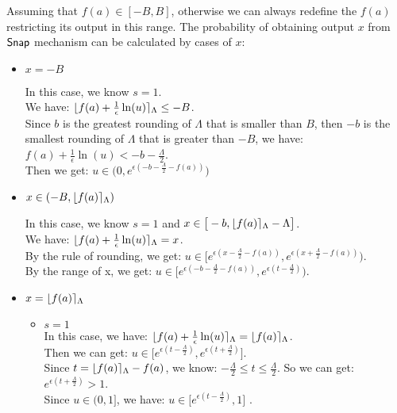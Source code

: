 \documentclass[a4paper,11pt]{article}
\begin{document}
Assuming that $f(a) \in [-B, B]$, otherwise we can always redefine the $f(a)$ restricting its output in this range.
The probability of obtaining output $x$ from $\mathsf{Snap}$ mechanism can be calculated by cases of $x$:
\begin{itemize}
	\item[\textbf{case}] $x = -B$

	In this case, we know $s = 1$.\\
	We have: $\lfloor f(a) + \frac{1}{\epsilon} \ln(u) \rceil_{\Lambda} \leq -B $.\\
	Since $b$ is the greatest rounding of $\Lambda$ that is smaller than $B$,
	then $-b$ is the smallest rounding of $\Lambda$ that is greater than $-B$, we have:
	$f(a) + \frac{1}{\epsilon} \ln(u) < -b - \frac{\Lambda}{2}$.\\
	Then we get:
	{\color{red}
	$u \in 
	\big(
	0, e^{\epsilon (-b - \frac{\Lambda}{2} - f(a))}
	\big)$
	}

	\item[\textbf{case}] $x \in (-B, \lfloor f(a) \rceil_{\Lambda})$
	
	In this case, we know $s = 1$ 
	and $x \in \big[-b, \lfloor f(a) \rceil_{\Lambda} - \Lambda\big]$.\\
	We have: $\lfloor f(a) + \frac{1}{\epsilon} \ln(u) \rceil_{\Lambda} = x $.\\
	By the rule of rounding, we get:
	{\color{red}
	$u \in 
	\bigg[
	e^{\epsilon (x - \frac{\Lambda}{2} - f(a))},
	e^{\epsilon (x + \frac{\Lambda}{2} - f(a))}
	\bigg)$}.\\
	By the range of x, we get:
	{\color{red}
	$u \in 
	\bigg[
	e^{\epsilon (-b - \frac{\Lambda}{2} - f(a))},
	e^{\epsilon (t - \frac{\Lambda}{2})}
	\bigg)$}.


	\item[\textbf{case}] $x = \lfloor f(a) \rceil_{\Lambda}$

	\begin{itemize}
		\item[\textbf{subcase}] $s = 1$\\
		In this case, we have: $\lfloor f(a) + \frac{1}{\epsilon} \ln(u) \rceil_{\Lambda} = \lfloor f(a) \rceil_{\Lambda}$.\\
		Then we can get:
		$u \in 
		\big[
		e^{\epsilon(t - \frac{\Lambda}{2})},
		e^{\epsilon(t + \frac{\Lambda}{2})}
		\big]$.\\
		Since $t = \lfloor f(a) \rceil_{\Lambda} - f(a)$, we know: $- \frac{\Lambda}{2} \leq t \leq \frac{\Lambda}{2}$. So we can get: $e^{\epsilon(t + \frac{\Lambda}{2})} > 1$.\\
		Since $u \in (0, 1]$, we have:
		{\color{red}
		$u \in 
		\big[
		e^{\epsilon(t - \frac{\Lambda}{2})}, 1
		\big]$
		}.


\end{itemize}
\end{itemize}
\end{document}
